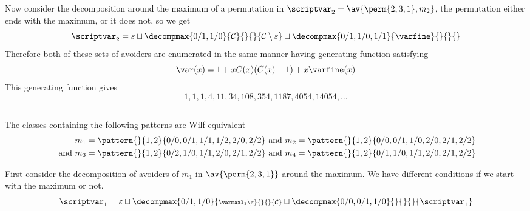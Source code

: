 Now consider the decomposition around the maximum of a permutation in
\(\scriptvar_2 = \av{\perm{2,3,1},m_2}\), the permutation either ends with
the maximum, or it does not, so we get
\begin{equation*}
    \scriptvar_2 = \varepsilon \sqcup
    \decompmax{0/1,1/0}{\mathcal{C}}{}{}{\mathcal{C}\setminus\varepsilon} \sqcup
    \decompmax{0/1,1/0,1/1}{\mathcal{\varfine}}{}{}{}
\end{equation*}
Therefore both of these sets of avoiders are enumerated in the same manner
having generating function satisfying
\begin{equation*}
    \var(x) = 1 + xC(x)(C(x)-1) + x\varfine(x)
\end{equation*}
This generating function gives
\begin{equation*}
    1, 1, 1, 4, 11, 34, 108, 354, 1187, 4054, 14054,\dotsc
\end{equation*}


\subsection{}
\nextvar
The classes containing the following patterns are Wilf-equivalent
\begin{equation*}
    \begin{aligned}
        m_1 = \pattern{}{1,2}{0/0,0/1,1/1,1/2,2/0,2/2} &\text{ and }
        m_2 = \pattern{}{1,2}{0/0,0/1,1/0,2/0,2/1,2/2} \\
        \text{ and }
        m_3 = \pattern{}{1,2}{0/2,1/0,1/1,2/0,2/1,2/2} &\text{ and }
        m_4 = \pattern{}{1,2}{0/1,1/0,1/1,2/0,2/1,2/2}
    \end{aligned}
\end{equation*}

First consider the decomposition of avoiders of \(m_1\) in \(\av{\perm{2,3,1}}\)
around the maximum. We have different conditions if we start with the maximum or not.
\begin{equation*}
    \scriptvar_1 =
    \varepsilon \sqcup
    \decompmax{0/1,1/0}{\scriptstyle \mathcal{\varmaxl}_1\setminus\varepsilon}{}{}{\mathcal{C}}
    \sqcup
    \decompmax{0/0,0/1,1/0}{}{}{}{\scriptvar_1}
\end{equation*}

